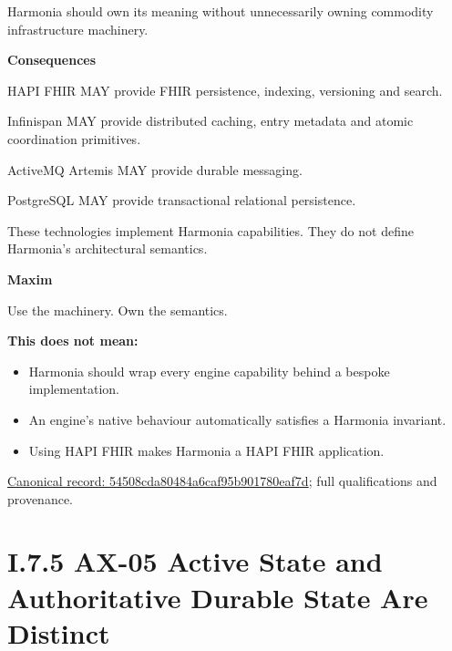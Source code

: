 Harmonia should own its meaning without unnecessarily owning commodity
infrastructure machinery.



\par\medskip\textbf{Consequences}\par


HAPI FHIR MAY provide FHIR persistence, indexing, versioning and search.



Infinispan MAY provide distributed caching, entry metadata and atomic
coordination primitives.



ActiveMQ Artemis MAY provide durable messaging.



PostgreSQL MAY provide transactional relational persistence.



These technologies implement Harmonia capabilities. They do not define
Harmonia's architectural semantics.



\par\medskip\textbf{Maxim}\par


Use the machinery. Own the semantics.



\textbf{This does not mean:}



\begin{itemize}


\item Harmonia should wrap every engine capability behind a bespoke implementation.

\item An engine's native behaviour automatically satisfies a Harmonia invariant.

\item Using HAPI FHIR makes Harmonia a HAPI FHIR application.

\end{itemize}

{\footnotesize \href{../../../../continuum/motivation/principle/54508cda80484a6caf95b901780eaf7d.md}{Canonical record: 54508cda80484a6caf95b901780eaf7d}; full qualifications and provenance.}\par
\section*{I.7.5 AX-05 Active State and Authoritative Durable State Are Distinct}
\label{navigation:I.7.5}

